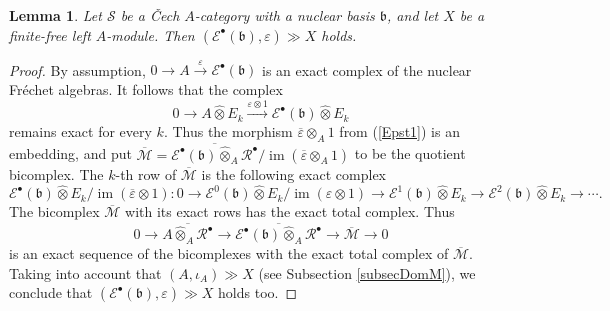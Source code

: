 \documentclass[12pt]{amsart}%
\theoremstyle{plain}
\newtheorem{lemma}{Lemma}
\numberwithin{equation}{section}
\numberwithin{equation}{section}
\numberwithin{theorem}{section}
\numberwithin{lemma}{section}
\numberwithin{remark}{section}
\numberwithin{example}{section}
\numberwithin{proposition}{section}
\numberwithin{definition}{section}
\numberwithin{corollary}{section}
\begin{document}
\begin{lemma}
\label{td2}Let $\mathcal{S}$ be a \v{C}ech $A$-category with a nuclear basis
$\mathfrak{b}$, and let $X$ be a finite-free left $A$-module. Then $\left(
\mathcal{E}^{\bullet}\left(  \mathfrak{b}\right)  ,\varepsilon\right)  \gg X$ holds.
\end{lemma}

\begin{proof}
By assumption, $0\rightarrow A\overset{\varepsilon}{\longrightarrow
}\mathcal{E}^{\bullet}\left(  \mathfrak{b}\right)  $ is an exact complex of
the nuclear Fr\'{e}chet algebras. It follows that the complex%
\[
0\rightarrow A\widehat{\otimes}E_{k}\overset{\varepsilon\otimes
1}{\longrightarrow}\mathcal{E}^{\bullet}\left(  \mathfrak{b}\right)
\widehat{\otimes}E_{k}%
\]
remains exact \cite[A1.6 (d)]{EP} for every $k$. Thus the morphism
$\overline{\varepsilon}\otimes_{A}1$ from (\ref{Epst1}) is an embedding, and
put $\overline{\mathcal{M}}=\overline{\mathcal{E}^{\bullet}\left(
\mathfrak{b}\right)  \widehat{\otimes}_{A}\mathcal{R}^{\bullet}}%
/\operatorname{im}\left(  \overline{\varepsilon}\otimes_{A}1\right)  $ to be
the quotient bicomplex. The $k$-th row of $\overline{\mathcal{M}}$ is the
following exact complex
\[
\mathcal{E}^{\bullet}\left(  \mathfrak{b}\right)  \widehat{\otimes}%
E_{k}/\operatorname{im}\left(  \overline{\varepsilon}\otimes1\right)
:0\rightarrow\mathcal{E}^{0}\left(  \mathfrak{b}\right)  \widehat{\otimes
}E_{k}/\operatorname{im}\left(  \varepsilon\otimes1\right)  \rightarrow
\mathcal{E}^{1}\left(  \mathfrak{b}\right)  \widehat{\otimes}E_{k}%
\rightarrow\mathcal{E}^{2}\left(  \mathfrak{b}\right)  \widehat{\otimes}%
E_{k}\rightarrow\cdots\text{.}%
\]
The bicomplex $\overline{\mathcal{M}}$ with its exact rows has the exact total
complex. Thus
\[
0\rightarrow\overline{A\widehat{\otimes}_{A}\mathcal{R}^{\bullet}}%
\rightarrow\overline{\mathcal{E}^{\bullet}\left(  \mathfrak{b}\right)
\widehat{\otimes}_{A}\mathcal{R}^{\bullet}}\rightarrow\overline{\mathcal{M}%
}\rightarrow0
\]
is an exact sequence of the bicomplexes with the exact total complex of
$\overline{\mathcal{M}}$. Taking into account that $\left(  A,\iota
_{A}\right)  \gg X$ (see Subsection \ref{subsecDomM}), we conclude that
$\left(  \mathcal{E}^{\bullet}\left(  \mathfrak{b}\right)  ,\varepsilon
\right)  \gg X$ holds \cite[Lemma 2.3]{DosJOT10} too.
\end{proof}
\end{document}
